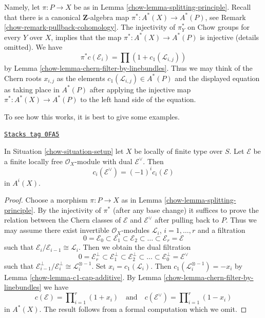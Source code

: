 \medskip\noindent
Namely, let $\pi : P \to X$ be as in Lemma \ref{chow-lemma-splitting-principle}.
Recall that there is a canonical $\mathbf{Z}$-algebra map
$\pi^* : A^*(X) \to A^*(P)$, see
Remark \ref{chow-remark-pullback-cohomology}. The injectivity of $\pi_Y^*$
on Chow groups for every $Y$ over $X$, implies that the map
$\pi^* : A^*(X) \to A^*(P)$ is injective (details omitted).
We have
$$
\pi^*c(\mathcal{E}_i) = \prod (1 + c_1(\mathcal{L}_{i, j}))
$$
by Lemma \ref{chow-lemma-chern-filter-by-linebundles}. Thus we may think of the
Chern roots $x_{i, j}$ as the elements $c_1(\mathcal{L}_{i, j}) \in A^*(P)$
and the displayed equation as taking place in $A^*(P)$ after
applying the injective map $\pi^* : A^*(X) \to A^*(P)$ to the left
hand side of the equation.

\medskip\noindent
To see how this works, it is best to give some examples.

\begin{lemma}
\label{chow-lemma-chern-classes-dual}
\href{https://stacks.math.columbia.edu/tag/0FA5}{\texttt{Stacks tag 0FA5}}

In Situation \ref{chow-situation-setup} let $X$ be locally of finite type over $S$.
Let $\mathcal{E}$ be a finite locally free $\mathcal{O}_X$-module
with dual $\mathcal{E}^\vee$. Then
$$
c_i(\mathcal{E}^\vee) = (-1)^i c_i(\mathcal{E})
$$
in $A^i(X)$.
\end{lemma}

\begin{proof}

Choose a morphism $\pi : P \to X$ as in
Lemma \ref{chow-lemma-splitting-principle}.
By the injectivity of $\pi^*$ (after any base change)
it suffices to prove the relation between
the Chern classes of $\mathcal{E}$ and $\mathcal{E}^\vee$
after pulling back to $P$. Thus we may assume there
exist invertible $\mathcal{O}_X$-modules
${\mathcal L}_i$, $i = 1, \ldots, r$
and a filtration
$$
0 = \mathcal{E}_0 \subset \mathcal{E}_1 \subset \mathcal{E}_2
\subset \ldots \subset \mathcal{E}_r = \mathcal{E}
$$
such that $\mathcal{E}_i/\mathcal{E}_{i - 1} \cong \mathcal{L}_i$.
Then we obtain the dual filtration
$$
0 = \mathcal{E}_r^\perp \subset \mathcal{E}_1^\perp \subset \mathcal{E}_2^\perp
\subset \ldots \subset \mathcal{E}_0^\perp = \mathcal{E}^\vee
$$
such that $\mathcal{E}_{i - 1}^\perp/\mathcal{E}_i^\perp \cong
\mathcal{L}_i^{\otimes -1}$.
Set $x_i = c_1(\mathcal{L}_i)$.
Then $c_1(\mathcal{L}_i^{\otimes -1}) = - x_i$
by Lemma \ref{chow-lemma-c1-cap-additive}.
By Lemma \ref{chow-lemma-chern-filter-by-linebundles}
we have
$$
c(\mathcal{E}) = \prod\nolimits_{i = 1}^r (1 + x_i)
\quad\text{and}\quad
c(\mathcal{E}^\vee) = \prod\nolimits_{i = 1}^r (1 - x_i)
$$
in $A^*(X)$. The result follows from a formal computation
which we omit.
\end{proof}

